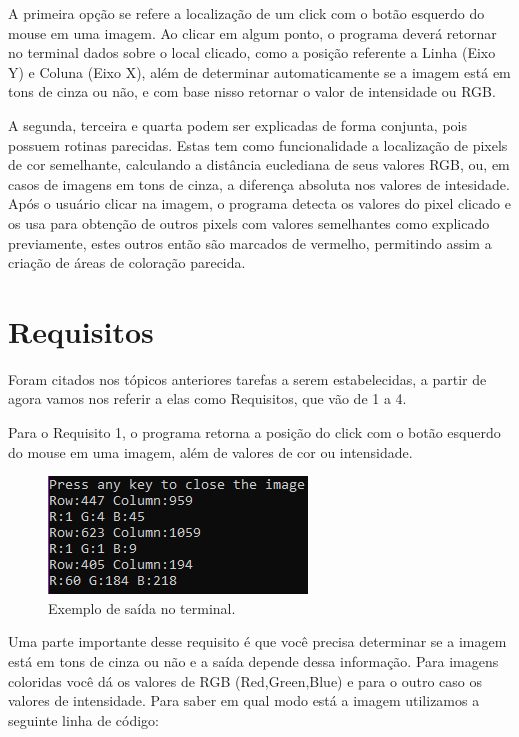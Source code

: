\documentclass{bmvc2k}
\begin{document}
\pagebreak

A primeira opção se refere a localização de um click com o botão esquerdo do mouse 
em uma imagem. Ao clicar em algum ponto, o programa deverá retornar no terminal
dados sobre o local clicado, como a posição referente a Linha (Eixo Y) e Coluna (Eixo X),
além de determinar automaticamente se a imagem está em tons de cinza ou não, e com base nisso
retornar o valor de intensidade ou RGB. 

A segunda, terceira e quarta podem ser explicadas de forma conjunta, pois
possuem rotinas parecidas. Estas tem como funcionalidade a localização de
pixels de cor semelhante, calculando a distância euclediana de seus valores
RGB, ou, em casos de imagens em tons de cinza, a diferença absoluta nos valores
de intesidade. Após o usuário clicar na imagem, o programa detecta os valores
do pixel clicado e os usa para obtenção de outros pixels com valores semelhantes como
explicado previamente, estes outros então são marcados de vermelho, permitindo assim
a criação de áreas de coloração parecida. 
\section{Requisitos}

Foram citados nos tópicos anteriores tarefas a serem estabelecidas, a partir de
agora vamos nos referir a elas como Requisitos, que vão de 1 a 4.

Para o Requisito 1, o programa retorna a posição do click com o botão esquerdo do mouse
em uma imagem, além de valores de cor ou intensidade. 

\begin{figure}[h]
    \centering
    \includegraphics[scale=0.8]{Figs/r11.png}
    \caption{Exemplo de saída no terminal.}
\end{figure}

Uma parte importante desse requisito é que você precisa determinar se a imagem
está em tons de cinza ou não e a saída depende dessa informação. Para imagens coloridas
você dá os valores de RGB (Red,Green,Blue) e para o outro caso os valores de
intensidade. Para saber em qual modo está a imagem utilizamos a seguinte linha de código:
\end{document}
